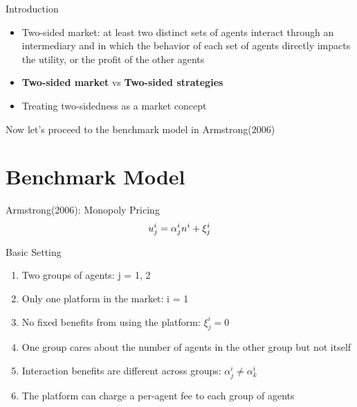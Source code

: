 \documentclass[aspectratio=169]{beamer}  %
\begin{document}
\begin{frame}{Introduction}
    \begin{itemize}        
        \item Two-sided market: at least two distinct sets of agents interact through an intermediary and in which the behavior of each set of agents directly impacts the utility, or the profit of the other agents
        \vspace{1em}
        \item \textbf{Two-sided market} vs \textbf{Two-sided strategies}
        \vspace{1em}
        \item Treating two-sidedness as a market concept
    \end{itemize}
    \vspace{2em}
\quad \quad Now let's proceed to the benchmark model in Armstrong(2006)
\end{frame}

\section{Benchmark Model}
\begin{frame}{Armstrong(2006): Monopoly Pricing}
    \begin{equation*}
        \Large
        u_{j}^{i} = \alpha_{j}^{i} n^{i} + \xi_{j}^{i}
    \end{equation*}
    \begin{block}{Basic Setting}
        \begin{enumerate}
            \item Two groups of agents: j = 1, 2
            \item Only one platform in the market: i = 1
            \item No fixed benefits from using the platform: $\xi_{j}^{i} = 0$
            \item One group cares about the number of agents in the other group but not itself
            \item Interaction benefits are different across groups: $\alpha_{j}^{i} \neq \alpha_{k}^{i}$
            \item The platform can charge a per-agent fee to each group of agents
        \end{enumerate}
    \end{block}

\end{frame}
\end{document}
